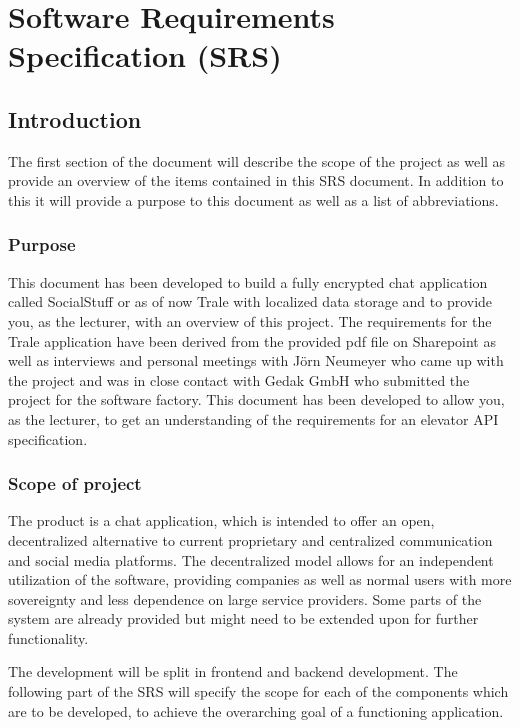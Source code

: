 \chapter{Software Requirements Specification (SRS)}\label{ch:software-requirements-specification-(srs)}


\section{Introduction}\label{sec:introduction}
The first section of the document will describe the scope of the project as well as provide an overview of the items
contained in this SRS document.
In addition to this it will provide a purpose to this document as well as a list of abbreviations.

\subsection{Purpose}\label{subsec:purpose}
This document has been developed to build a fully encrypted chat application called SocialStuff or as of now Trale with
localized data storage and to provide you, as the lecturer, with an overview of this project.
The requirements for the Trale application have been derived from the provided pdf file on Sharepoint as well as
interviews and personal meetings with J\"orn Neumeyer who came up with the project and was in close contact with Gedak
GmbH who submitted the project for the software factory.
This document has been developed to allow you, as the lecturer, to get an understanding of the requirements for an
elevator API specification.

\subsection{Scope of project}\label{subsec:scope-of-project}
The product is a chat application, which is intended to offer an open, decentralized alternative to current proprietary
and centralized communication and social media platforms.
The decentralized model allows for an independent utilization of the software, providing companies as well as normal
users with more sovereignty and less dependence on large service providers.
Some parts of the system are already provided but might need to be extended upon for further functionality.

The development will be split in frontend and backend development.
The following part of the SRS will specify the scope for each of the components which are to be developed, to achieve
the overarching goal of a functioning application.

